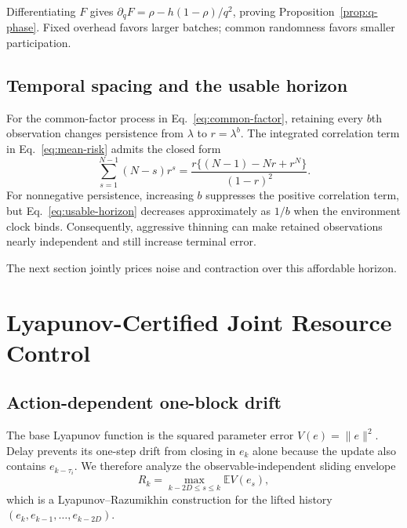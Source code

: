 \documentclass[journal]{IEEEtran}
\newcommand{\E}{\mathbb{E}}
\begin{document}
Differentiating $F$ gives $\partial_qF=\rho-h(1-\rho)/q^2$, proving Proposition~\ref{prop:q-phase}.
Fixed overhead favors larger batches; common randomness favors smaller participation.

\subsection{Temporal spacing and the usable horizon}
For the common-factor process in Eq.~\eqref{eq:common-factor}, retaining every $b$th observation changes persistence from $\lambda$ to $r=\lambda^b$.
The integrated correlation term in Eq.~\eqref{eq:mean-risk} admits the closed form
\begin{equation}
\sum_{s=1}^{N-1}(N-s)r^s
=\frac{r\{(N-1)-Nr+r^N\}}{(1-r)^2}.
\label{eq:geometric-correlation-sum}
\end{equation}
For nonnegative persistence, increasing $b$ suppresses the positive correlation term, but Eq.~\eqref{eq:usable-horizon} decreases approximately as $1/b$ when the environment clock binds.
Consequently, aggressive thinning can make retained observations nearly independent and still increase terminal error.

The next section jointly prices noise and contraction over this affordable horizon.

\section{Lyapunov-Certified Joint Resource Control}
\subsection{Action-dependent one-block drift}
The base Lyapunov function is the squared parameter error $V(e)=\|e\|^2$.
Delay prevents its one-step drift from closing in $e_k$ alone because the update also contains $e_{k-\tau_i}$.
We therefore analyze the observable-independent sliding envelope
\begin{equation}
R_k=\max_{k-2D\le s\le k}\E V(e_s),
\label{eq:sliding-envelope}
\end{equation}
which is a Lyapunov--Razumikhin construction for the lifted history $(e_k,e_{k-1},\ldots,e_{k-2D})$.
\end{document}
